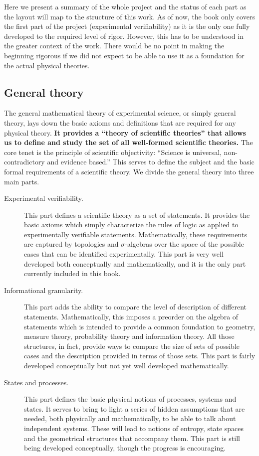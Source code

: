 \documentclass[11pt,letterpaper,fleqn]{memoir} %
\begin{document}
Here we present a summary of the whole project and the status of each part as the layout will map to the structure of this work. As of now, the book only covers the first part of the project (experimental verifiability) as it is the only one fully developed to the required level of rigor. However, this has to be understood in the greater context of the work. There would be no point in making the beginning rigorous if we did not expect to be able to use it as a foundation for the actual physical theories.

\subsection{General theory}

The general mathematical theory of experimental science, or simply general theory, lays down the basic axioms and definitions that are required for any physical theory. \textbf{It provides a ``theory of scientific theories'' that allows us to define and study the set of all well-formed scientific theories.} The core tenet is the principle of scientific objectivity: ``Science is universal, non-contradictory and evidence based.'' This serves to define the subject and the basic formal requirements of a scientific theory. We divide the general theory into three main parts.

\begin{description}
	\item[Experimental verifiability.] This part defines a scientific theory as a set of statements. It provides the basic axioms which simply characterize the rules of logic as applied to experimentally verifiable statements. Mathematically, these requirements are captured by topologies and $\sigma$-algebras over the space of the possible cases that can be identified experimentally. This part is very well developed both conceptually and mathematically, and it is the only part currently included in this book. 
	
	\item[Informational granularity.] This part adds the ability to compare the level of description of different statements. Mathematically, this imposes a preorder on the algebra of statements which is intended to provide a common foundation to geometry, measure theory, probability theory and information theory. All those structures, in fact, provide ways to compare the size of sets of possible cases and the description provided in terms of those sets. This part is fairly developed conceptually but not yet well developed mathematically.
	
	\item[States and processes.] This part defines the basic physical notions of processes, systems and states. It serves to bring to light a series of hidden assumptions that are needed, both physically and mathematically, to be able to talk about independent systems. These will lead to notions of entropy, state spaces and the geometrical structures that accompany them. This part is still being developed conceptually, though the progress is encouraging.
\end{description}
\end{document}
